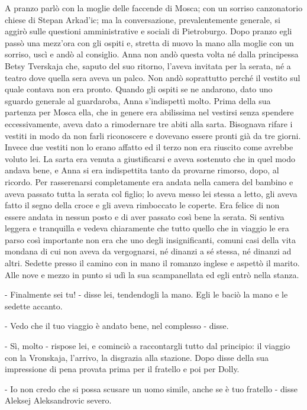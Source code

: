 A pranzo parlò con la moglie delle faccende di Mosca; con un sorriso canzonatorio chiese di Stepan Arkad'ic; ma la conversazione, prevalentemente generale, si aggirò sulle questioni amministrative e sociali di Pietroburgo. Dopo pranzo egli passò una mezz'ora con gli ospiti e, stretta di nuovo la mano alla moglie con un sorriso, uscì e andò al consiglio. Anna non andò questa volta né dalla principessa Betsy Tverskaja che, saputo del suo ritorno, l'aveva invitata per la serata, né a teatro dove quella sera aveva un palco. Non andò soprattutto perché il vestito sul quale contava non era pronto. Quando gli ospiti se ne andarono, dato uno sguardo generale al guardaroba, Anna s'indispettì molto. Prima della sua partenza per Mosca ella, che in genere era abilissima nel vestirsi senza spendere eccessivamente, aveva dato a rimodernare tre abiti alla sarta. Bisognava rifare i vestiti in modo da non farli riconoscere e dovevano essere pronti già da tre giorni. Invece due vestiti non lo erano affatto ed il terzo non era riuscito come avrebbe voluto lei. La sarta era venuta a giustificarsi e aveva sostenuto che in quel modo andava bene, e Anna si era indispettita tanto da provarne rimorso, dopo, al ricordo. Per rasserenarsi completamente era andata nella camera del bambino e aveva passato tutta la serata col figlio; lo aveva messo lei stessa a letto, gli aveva fatto il segno della croce e gli aveva rimboccato le coperte. Era felice di non essere andata in nessun posto e di aver passato così bene la serata. Si sentiva leggera e tranquilla e vedeva chiaramente che tutto quello che in viaggio le era parso così importante non era che uno degli insignificanti, comuni casi della vita mondana di cui non aveva da vergognarsi, né dinanzi a sé stessa, né dinanzi ad altri. Sedette presso il camino con in mano il romanzo inglese e aspettò il marito. Alle nove e mezzo in punto si udì la sua scampanellata ed egli entrò nella stanza. 

- Finalmente sei tu! - disse lei, tendendogli la mano. Egli le baciò la mano e le sedette accanto. 

- Vedo che il tuo viaggio è andato bene, nel complesso - disse. 

- Sì, molto - rispose lei, e cominciò a raccontargli tutto dal principio: il viaggio con la Vronskaja, l'arrivo, la disgrazia alla stazione. Dopo disse della sua impressione di pena provata prima per il fratello e poi per Dolly. 

- Io non credo che si possa scusare un uomo simile, anche se è tuo fratello - disse Aleksej Aleksandrovic severo. 


